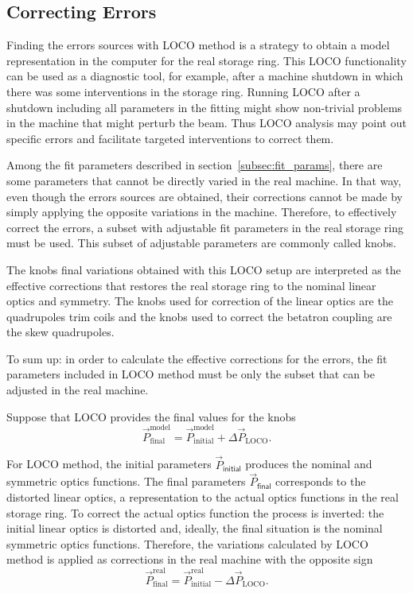 \subsection{Correcting Errors}
Finding the errors sources with LOCO method is a strategy to obtain a model representation in the computer for the real storage ring. This LOCO functionality can be used as a diagnostic tool, for example, after a machine shutdown in which there was some interventions in the storage ring. Running LOCO after a shutdown including all parameters in the fitting might show non-trivial problems in the machine that might perturb the beam. Thus LOCO analysis may point out specific errors and facilitate targeted interventions to correct them.

Among the fit parameters described in section~\ref{subsec:fit_params}, there are some parameters that cannot be directly varied in the real machine. In that way, even though the errors sources are obtained, their corrections cannot be made by simply applying the opposite variations in the machine. Therefore, to effectively correct the errors, a subset with adjustable fit parameters in the real storage ring must be used. This subset of adjustable parameters are commonly called knobs.

The knobs final variations obtained with this LOCO setup are interpreted as the effective corrections that restores the real storage ring to the nominal linear optics and symmetry. The knobs used for correction of the linear optics are the quadrupoles trim coils and the knobs used to correct the betatron coupling are the skew quadrupoles. 

To sum up: in order to calculate the effective corrections for the errors, the fit parameters included in LOCO method must be only the subset that can be adjusted in the real machine.

Suppose that LOCO provides the final values for the knobs
\begin{equation}
    \vec{P}_{\mathrm{final}}^{\mathrm{model}} = \vec{P}_{\mathrm{initial}}^{\mathrm{model}} + \Delta\vec{P}_{\mathrm{LOCO}}.
\end{equation}

For LOCO method, the initial parameters $\vec{P}_{\mathsf{initial}}$ produces the nominal and symmetric optics functions. The final parameters $\vec{P}_{\mathsf{final}}$ corresponds to the distorted linear optics, a representation to the actual optics functions in the real storage ring. To correct the actual optics function the process is inverted: the initial linear optics is distorted and, ideally, the final situation is the nominal symmetric optics functions. Therefore, the variations calculated by LOCO method is applied as corrections in the real machine with the opposite sign
\begin{equation}
    \vec{P}_{\mathrm{final}}^{\mathrm{real}} = \vec{P}_{\mathrm{initial}}^{\mathrm{real}} - \Delta\vec{P}_{\mathrm{LOCO}}.
\end{equation}
